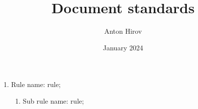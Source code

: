 \documentclass[12pt,a4paper,twoside,BCOR=5.8mm,DIV=15]{scrreprt}
\title{Document standards}
\author{Anton Hirov}
\date{January 2024}
\begin{document}
\maketitle

\begin{enumerate}
    \item Rule name: rule;
    \begin{enumerate}
        \item Sub rule name: rule;
    \end{enumerate}
\end{enumerate}
\end{document}
